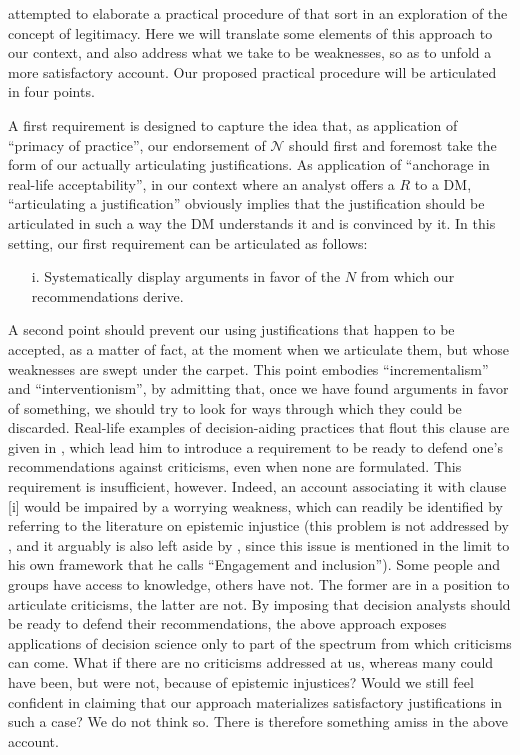\documentclass[preprint, french, english, 11pt, authoryear]{elsarticle}%
\newcommand{\adv}{\mathscr{N}}
\begin{document}
\citet{meinard_what_2017} attempted to elaborate a practical procedure of that sort in an exploration of the concept of legitimacy. Here we will translate some elements of this approach to our context, and also address what we take to be weaknesses, so as to unfold a more satisfactory account. Our proposed practical procedure will be articulated in four points.

A first requirement is designed to capture the idea that, as application of “primacy of practice”, our endorsement of $\adv$ should first and foremost take the form of our actually articulating justifications. As application of ``anchorage in real-life acceptability'', in our context where an analyst offers a $R$ to a \ac{DM}, ``articulating a justification'' obviously implies that the justification should be articulated in such a way the \ac{DM} understands it and is convinced by it. In this setting, our first requirement can be articulated as follows:

\begin{itemize}
\item[i.]	Systematically display arguments in favor of the $N$ from which our recommendations derive.
\end{itemize}
A second point should prevent our using justifications that happen to be accepted, as a matter of fact, at the moment when we articulate them, but whose weaknesses are swept under the carpet. This point embodies “incrementalism” and ``interventionism'', by admitting that, once we have found arguments in favor of something, we should try to look for ways through which they could be discarded. Real-life examples of decision-aiding practices that flout this clause are given in \cite{meinard_what_2017}, which lead him to introduce a requirement to be ready to defend one's recommendations against criticisms, even when none are formulated. This requirement is insufficient, however. Indeed, an account associating it with clause [i] would be impaired by a worrying weakness, which can readily be identified by referring to the literature on epistemic injustice \citep{fricker_epistemic_2007} (this problem is not addressed by \cite{meinard_what_2017}, and it arguably is also left aside by \cite{mingers_ethics_2011}, since this issue is mentioned in the limit to his own framework that he calls ``Engagement and inclusion''). Some people and groups have access to knowledge, others have not. The former are in a position to articulate criticisms, the latter are not. By imposing that decision analysts should be ready to defend their recommendations, the above approach exposes applications of decision science only to part of the spectrum from which criticisms can come. What if there are no criticisms addressed at us, whereas many could have been, but were not, because of epistemic injustices? Would we still feel confident in claiming that our approach materializes satisfactory justifications in such a case? We do not think so. There is therefore something amiss in the above account.
\end{document}
